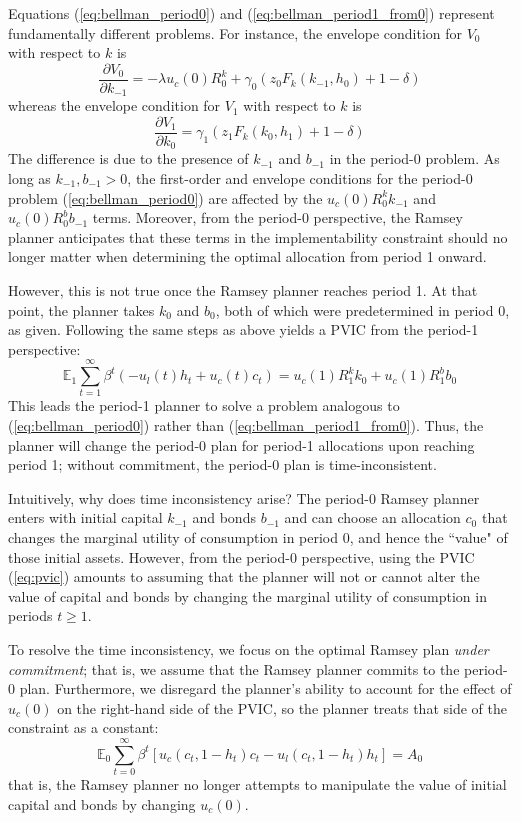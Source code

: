 \documentclass[12pt]{article}
\newcommand{\E}{\mathbb{E}}
\begin{document}
Equations (\ref{eq:bellman_period0}) and (\ref{eq:bellman_period1_from0}) represent fundamentally different problems. For instance, the envelope condition for $V_0$ with respect to $k$ is
\begin{equation}
	\frac{\partial V_0}{\partial k_{-1}} = - \lambda u_c(0) R_0^k + \gamma_0 (z_0 F_k(k_{-1}, h_0) + 1-\delta)
\end{equation}
whereas the envelope condition for $V_1$ with respect to $k$ is
\begin{equation}
	\frac{\partial V_1}{\partial k_{0}} = \gamma_1 (z_1 F_k(k_{0}, h_1) + 1-\delta)
\end{equation}
The difference is due to the presence of $k_{-1}$ and $b_{-1}$ in the period-0 problem. As long as $k_{-1}, b_{-1} > 0$, the first-order and envelope conditions for the period-0 problem (\ref{eq:bellman_period0}) are affected by the $u_c(0) R_0^k k_{-1}$ and $u_c(0) R_0^b b_{-1}$ terms. Moreover, from the period-0 perspective, the Ramsey planner anticipates that these terms in the implementability constraint should no longer matter when determining the optimal allocation from period 1 onward.  

However, this is not true once the Ramsey planner reaches period 1. At that point, the planner takes $k_0$ and $b_0$, both of which were predetermined in period 0, as given. Following the same steps as above yields a PVIC from the period-1 perspective:
\begin{equation}
	\E_1 \sum_{t=1}^\infty\beta^t( -u_l(t) h_t  + u_c(t) c_t ) = u_c(1)R_1^k k_{0} + u_c(1)R_1^b b_{0}
\end{equation}
This leads the period-1 planner to solve a problem analogous to (\ref{eq:bellman_period0}) rather than (\ref{eq:bellman_period1_from0}). Thus, the planner will change the period-0 plan for period-1 allocations upon reaching period 1; without commitment, the period-0 plan is time-inconsistent.

Intuitively, why does time inconsistency arise? The period-0 Ramsey planner enters with initial capital $k_{-1}$ and bonds $b_{-1}$ and can choose an allocation $c_0$ that changes the marginal utility of consumption in period 0, and hence the ``value" of those initial assets. However, from the period-0 perspective, using the PVIC (\ref{eq:pvic}) amounts to assuming that the planner will not or cannot alter the value of capital and bonds by changing the marginal utility of consumption in periods $t \geq 1$. 

To resolve the time inconsistency, we focus on the optimal Ramsey plan \textit{under commitment}; that is, we assume that the Ramsey planner commits to the period-0 plan. Furthermore, we disregard the planner's ability to account for the effect of $u_c(0)$ on the right-hand side of the PVIC, so the planner treats that side of the constraint as a constant:
\[\E_0 \sum_{t=0}^\infty \beta^t[u_c(c_t, 1-h_t)c_t - u_l(c_t, 1-h_t)h_t] = A_0\]
that is, the Ramsey planner no longer attempts to manipulate the value of initial capital and bonds by changing $u_c(0)$.
\end{document}
